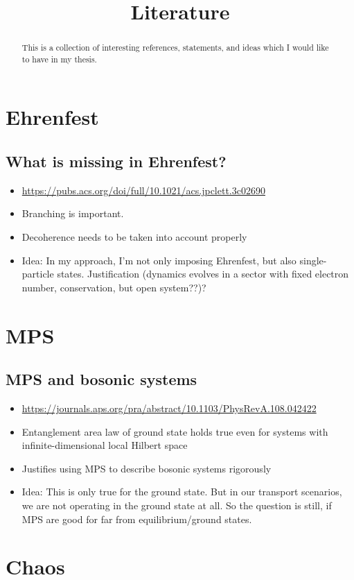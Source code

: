 \documentclass{article}
\begin{document}
\title{Literature}
\maketitle
\begin{abstract}
	This is a collection of interesting references, statements, and ideas which I would like to have in my thesis.
\end{abstract}
\section{Ehrenfest}
\subsection{What is missing in Ehrenfest?}
\begin{itemize}
	\item \url{https://pubs.acs.org/doi/full/10.1021/acs.jpclett.3c02690}
	\item Branching is important. 
	\item Decoherence needs to be taken into account properly
	\item Idea: In my approach, I'm not only imposing Ehrenfest, but also single-particle states. Justification (dynamics evolves in a sector with fixed electron number, conservation, but open system??)? 
\end{itemize}
\section{MPS}
\subsection{MPS and bosonic systems}
\begin{itemize}
	\item \url{https://journals.aps.org/pra/abstract/10.1103/PhysRevA.108.042422}
	\item Entanglement area law of ground state holds true even for systems with infinite-dimensional local Hilbert space
	\item Justifies using MPS to describe bosonic systems rigorously
	\item Idea: This is only true for the ground state. But in our transport scenarios, we are not operating in the ground state at all. So the question is still, if MPS are good for far from equilibrium/ground states.
\end{itemize}
\section{Chaos}
\end{document}
